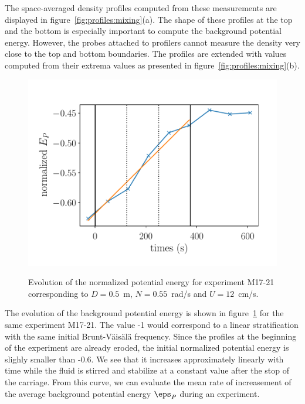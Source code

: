 The space-averaged density profiles computed from these measurements are
displayed in figure~\ref{fig:profiles:mixing}(a). The shape of these profiles
at the top and the bottom is especially important to compute the background
potential energy. However, the probes attached to profilers cannot measure the
density very close to the top and bottom boundaries. The profiles are extended
with values computed from their extrema values as presented in
figure~\ref{fig:profiles:mixing}(b).

\begin{figure}[htp!]
\includegraphics[width=\figwidth]{tmp/fig_energy_pot_vs_time}
\label{fig:energy:pot:vs:time}

\caption{Evolution of the normalized potential energy for experiment M17-21
corresponding to $D = 0.5$~m, $N=0.55$~rad/s and $U=12$~cm/s.}

\end{figure}

The evolution of the background potential energy is shown in
figure~\ref{fig:energy:pot:vs:time} for the same experiment M17-21. The value
-1 would correspond to a linear stratification with the same initial
Brunt-V\"ais\"al\"a frequency. Since the profiles at the beginning of the
experiment are already eroded, the initial normalized potential energy is
slighly smaller than -0.6. We see that it increases approximately linearly with
time while the fluid is stirred and stabilize at a constant value after the
stop of the carriage. From this curve, we can evaluate the mean rate of
increasement of the average background potential energy $\eps_P$ during an
experiment.


